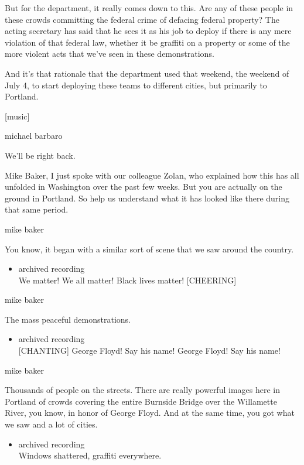 But for the department, it really comes down to this. Are any of these
people in these crowds committing the federal crime of defacing federal
property? The acting secretary has said that he sees it as his job to
deploy if there is any mere violation of that federal law, whether it be
graffiti on a property or some of the more violent acts that we've seen
in these demonstrations.

And it's that rationale that the department used that weekend, the
weekend of July 4, to start deploying these teams to different cities,
but primarily to Portland.

{[}music{]}

michael barbaro

We'll be right back.

Mike Baker, I just spoke with our colleague Zolan, who explained how
this has all unfolded in Washington over the past few weeks. But you are
actually on the ground in Portland. So help us understand what it has
looked like there during that same period.

mike baker

You know, it began with a similar sort of scene that we saw around the
country.

\begin{itemize}
\tightlist
\item
  archived recording\\
  We matter! We all matter! Black lives matter! {[}CHEERING{]}
\end{itemize}

mike baker

The mass peaceful demonstrations.

\begin{itemize}
\tightlist
\item
  archived recording\\
  {[}CHANTING{]} George Floyd! Say his name! George Floyd! Say his name!
\end{itemize}

mike baker

Thousands of people on the streets. There are really powerful images
here in Portland of crowds covering the entire Burnside Bridge over the
Willamette River, you know, in honor of George Floyd. And at the same
time, you got what we saw and a lot of cities.

\begin{itemize}
\tightlist
\item
  archived recording\\
  Windows shattered, graffiti everywhere.
\end{itemize}

